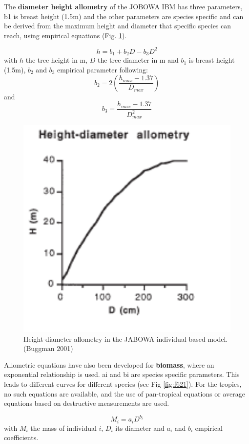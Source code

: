 \documentclass[12pt,oneside]{book}
\begin{document}
The \textbf{diameter height allometry} of the JOBOWA IBM has three
parameters, b1 is breast height (1.5m) and the other parameters are
species specific and can be derived from the maximum height and diameter
that specific species can reach, using empirical equations (Fig.
\ref{fig:f620}).

\[
h = b_1 + b_2D - b_3D^2
\] with \(h\) the tree height in m, \(D\) the tree diameter in m and
\(b_1\) is breast height (1.5m), \(b_2\) and \(b_3\) empirical parameter
following: \[
b_2=2\left(\frac{h_{max}-1.37}{D_{max}}\right)
\] and \[
b_3 = \frac{h_{max}-1.37}{D_{max}^2}
\]

\begin{figure}

{\centering \includegraphics[width=0.8\linewidth]{figures/chap6/f620_HD_allom} 

}

\caption{Height-diameter allometry in the JABOWA individual based model.(Buggman 2001)}\label{fig:f620}
\end{figure}

Allometric equations have also been developed for \textbf{biomass},
where an exponential relationship is used. ai and bi are species
specific parameters. This leads to different curves for different
species (see Fig \ref{fig:f621}). For the tropics, no such equations are
available, and the use of pan-tropical equations or average equations
based on destructive measurements are used.

\[
M_i=a_iD^{b_i}
\] with \(M_i\) the mass of individual \(i\), \(D_i\) its diameter and
\(a_i\) and \(b_i\) empirical coefficients.
\end{document}
